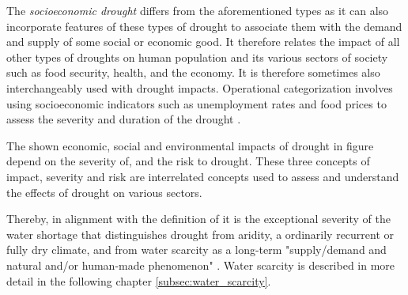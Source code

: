 {The \textit{socioeconomic drought} differs from the aforementioned types as it can also incorporate features of these types of drought to associate them with the demand and supply of some social or economic good. It therefore relates the impact of all other types of droughts on human population and its various sectors of society such as food security, health, and the economy. It is therefore sometimes also interchangeably used with drought impacts. Operational categorization involves using socioeconomic indicators such as unemployment rates and food prices to assess the severity and duration of the drought \autocite{nationaldroughtmitigationcenterTypesDrought,wilhiteUnderstandingDroughtPhenomenon1985}.


The shown economic, social and environmental impacts of drought in figure  depend on the severity of, and the risk to drought. These three concepts of impact, severity and risk are interrelated concepts used to assess and understand the effects of drought on various sectors. 


Thereby, in alignment with the definition of \autocite{vanloonDroughtHumanmodifiedWorld2016} it is the exceptional severity of the water shortage that distinguishes drought from aridity, a ordinarily recurrent or fully dry climate, and from water scarcity as a long-term "supply/demand and natural and/or human-made phenomenon" \autocites[7]{idmpDroughtWaterScarcity2022}{vereintenationenSpecialReportDrought2021, vanClimatologicalRiskDroughts2017}. Water scarcity is described in more detail in the following chapter \ref*{subsec:water_scarcity}.


}
